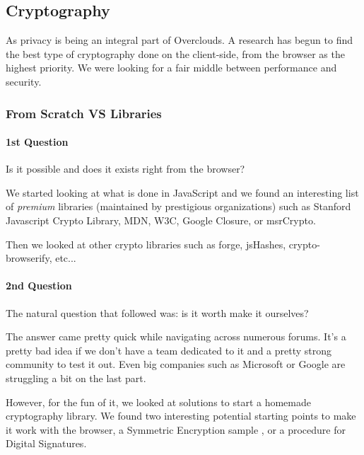 
\subsection{Cryptography}
As privacy is being an integral part of Overclouds. A research has begun to find the best type of cryptography done on the client-side, from the browser as the highest priority. We were looking for a fair middle between performance and security.

\subsubsection{From Scratch VS Libraries}
\paragraph{1st Question} Is it possible and does it exists right from the browser?

We started looking at what is done in JavaScript and we found an interesting list of \textit{premium} libraries (maintained by prestigious organizations) such as Stanford Javascript Crypto Library\cite{Stark2012SymmetricJavascript}, MDN\cite{MDN2015MDNCrypto}, W3C\cite{Sleevi2014WebAPI}, Google Closure\cite{Google2015ClosureLibrary}, or msrCrypto\cite{Microsoft2015MSRLibrary}.

Then we looked at other crypto libraries such as forge\cite{DigitalBazaar2016Forge}, jsHashes\cite{Johnston2015JsHashes}, crypto-browserify\cite{Tarr2013Crypto-Browserify}, etc...

\paragraph{2nd Question} The natural question that followed was: is it worth make it ourselves?

The answer came pretty quick while navigating across numerous forums. It's a pretty bad idea if we don't have a team dedicated to it and a pretty strong community to test it out. Even big companies such as Microsoft or Google are struggling a bit on the last part.

However, for the fun of it, we looked at solutions to start a homemade cryptography library. We found two interesting potential starting points to make it work with the browser, a Symmetric Encryption sample \cite{InfoTech2014SymmetricSample}, or a procedure for Digital Signatures\cite{InfoTech2014DigitalBrowser}.

